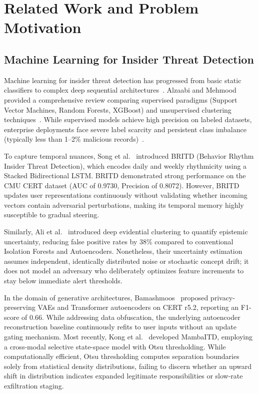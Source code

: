 \documentclass[conference]{IEEEtran}
\begin{document}
\section{Related Work and Problem Motivation}
\label{sec:related}

\subsection{Machine Learning for Insider Threat Detection}
Machine learning for insider threat detection has progressed from basic static classifiers to complex deep sequential architectures~\cite{alzaabi2024review}. Alzaabi and Mehmood provided a comprehensive review comparing supervised paradigms (Support Vector Machines, Random Forests, XGBoost) and unsupervised clustering techniques~\cite{cortes1995support, chen2016xgboost, liu2008isolation}. While supervised models achieve high precision on labeled datasets, enterprise deployments face severe label scarcity and persistent class imbalance (typically less than 1--2\% malicious records)~\cite{glasser2013cert}.

To capture temporal nuances, Song et al.~\cite{song2024britd} introduced BRITD (Behavior Rhythm Insider Threat Detection), which encodes daily and weekly rhythmicity using a Stacked Bidirectional LSTM. BRITD demonstrated strong performance on the CMU CERT dataset (AUC of 0.9730, Precision of 0.8072). However, BRITD updates user representations continuously without validating whether incoming vectors contain adversarial perturbations, making its temporal memory highly susceptible to gradual steering.

Similarly, Ali et al.~\cite{ali2025realtime} introduced deep evidential clustering to quantify epistemic uncertainty, reducing false positive rates by 38\% compared to conventional Isolation Forests and Autoencoders. Nonetheless, their uncertainty estimation assumes independent, identically distributed noise or stochastic concept drift; it does not model an adversary who deliberately optimizes feature increments to stay below immediate alert thresholds.

In the domain of generative architectures, Bamashmoos~\cite{bamashmoos2025adaptive} proposed privacy-preserving VAEs and Transformer autoencoders on CERT r5.2, reporting an F1-score of 0.66. While addressing data obfuscation, the underlying autoencoder reconstruction baseline continuously refits to user inputs without an update gating mechanism. Most recently, Kong et al.~\cite{kong2026mambaitd} developed MambaITD, employing a cross-modal selective state-space model with Otsu thresholding. While computationally efficient, Otsu thresholding computes separation boundaries solely from statistical density distributions, failing to discern whether an upward shift in distribution indicates expanded legitimate responsibilities or slow-rate exfiltration staging.
\end{document}
